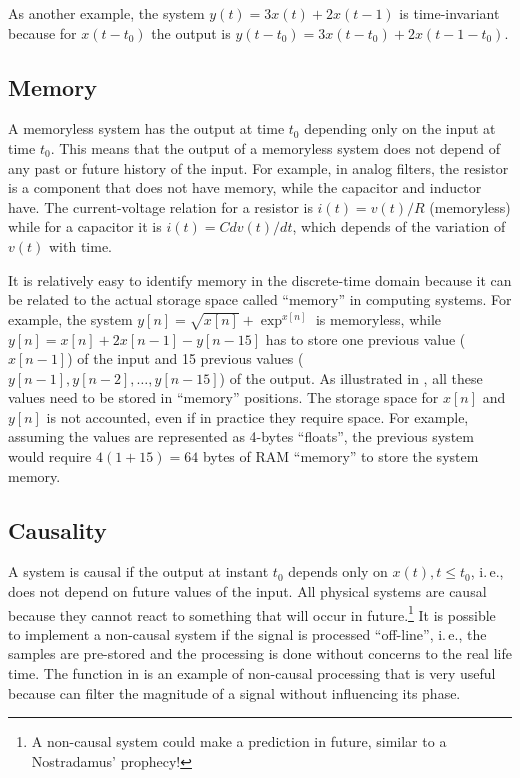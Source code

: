 As another example, the system $y(t)=3x(t) + 2x(t-1)$ is time-invariant because for $x(t-t_0)$ the output is $y(t-t_0)=3x(t-t_0) + 2x(t-1-t_0)$.

\subsection{Memory}

A memoryless system has the output at time $t_0$ depending only on the input at time $t_0$. This means that the output of a memoryless system does not depend of any past or future history of the input. 
For example, in analog filters, the resistor is a component that does not have memory, while the capacitor and inductor have. The current-voltage relation for a resistor is $i(t)=v(t)/R$ (memoryless) while for a capacitor it is $i(t)=C dv(t)/dt$, which depends of the variation of $v(t)$ with time.

It is relatively easy to identify memory in the discrete-time domain because it can be related to the actual storage space called ``memory'' in computing systems. For example, the system $y[n]= \sqrt{x[n]}+\exp^{x[n]}$ is memoryless, while $y[n]=x[n]+2x[n-1]-y[n-15]$ has to store one previous value ($x[n-1]$) of the input and 15 previous values ($y[n-1], y[n-2], \ldots, y[n-15]$) of the output. As illustrated in , all these values need to be stored in ``memory'' positions. The storage space for $x[n]$ and $y[n]$ is not accounted, even if in practice they require space. For example, assuming the values are represented as 4-bytes ``floats'', the previous system would require $4(1+15)=64$ bytes of RAM ``memory'' to store the system memory.

\subsection{Causality}

A system is causal if the output at instant $t_0$ depends only on $x(t), t \le t_0$, i.\,e., does not depend on future values of the input. All physical systems are causal because they cannot react to something that will occur in future.\footnote{A non-causal system could make a prediction in future, similar to a Nostradamus' prophecy!} It is possible to implement a non-causal system if the signal is processed ``off-line'', i.\,e., the samples are pre-stored and the processing is done without concerns to the real life time. The function  in {\matlab} is an example of non-causal processing that is very useful because can filter the magnitude of a signal without influencing its phase.

